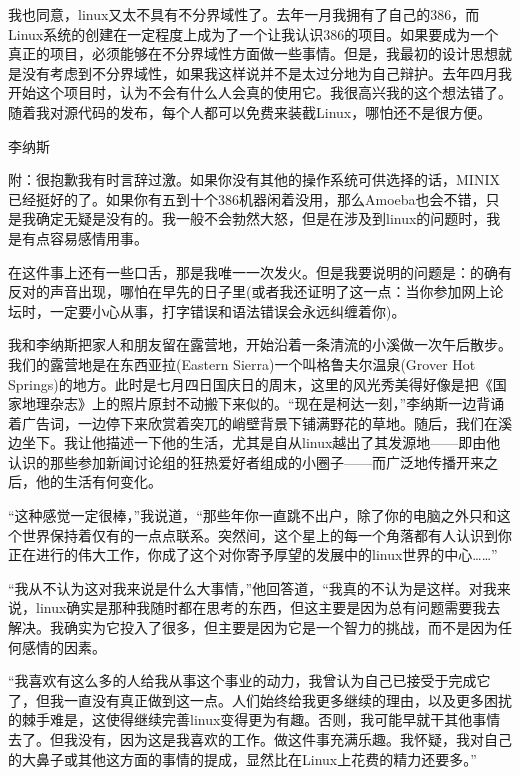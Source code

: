 我也同意，linux又太不具有不分界域性了。去年一月我拥有了自己的386，而Linux系统的创建在一定程度上成为了一个让我认识386的项目。如果要成为一个真正的项目，必须能够在不分界域性方面做一些事情。但是，我最初的设计思想就是没有考虑到不分界域性，如果我这样说并不是太过分地为自己辩护。去年四月我开始这个项目时，认为不会有什么人会真的使用它。我很高兴我的这个想法错了。随着我对源代码的发布，每个人都可以免费来装截Linux，哪怕还不是很方便。

李纳斯

 

附：很抱歉我有时言辞过激。如果你没有其他的操作系统可供选择的话，MINIX已经挺好的了。如果你有五到十个386机器闲着没用，那么Amoeba也会不错，只是我确定无疑是没有的。我一般不会勃然大怒，但是在涉及到linux的问题时，我是有点容易感情用事。

 

在这件事上还有一些口舌，那是我唯一一次发火。但是我要说明的问题是：的确有反对的声音出现，哪怕在早先的日子里(或者我还证明了这一点：当你参加网上论坛时，一定要小心从事，打字错误和语法错误会永远纠缠着你)。

 

我和李纳斯把家人和朋友留在露营地，开始沿着一条清流的小溪做一次午后散步。我们的露营地是在东西亚拉(Eastern Sierra)一个叫格鲁夫尔温泉(Grover Hot Springs)的地方。此时是七月四日国庆日的周末，这里的风光秀美得好像是把《国家地理杂志》上的照片原封不动搬下来似的。“现在是柯达一刻，”李纳斯一边背诵着广告词，一边停下来欣赏着突兀的峭壁背景下铺满野花的草地。随后，我们在溪边坐下。我让他描述一下他的生活，尤其是自从linux越出了其发源地——即由他认识的那些参加新闻讨论组的狂热爱好者组成的小圈子——而广泛地传播开来之后，他的生活有何变化。

“这种感觉一定很棒，”我说道，“那些年你一直跳不出户，除了你的电脑之外只和这个世界保持着仅有的一点点联系。突然间，这个星上的每一个角落都有人认识到你正在进行的伟大工作，你成了这个对你寄予厚望的发展中的linux世界的中心……”

“我从不认为这对我来说是什么大事情，”他回答道，“我真的不认为是这样。对我来说，linux确实是那种我随时都在思考的东西，但这主要是因为总有问题需要我去解决。我确实为它投入了很多，但主要是因为它是一个智力的挑战，而不是因为任何感情的因素。

“我喜欢有这么多的人给我从事这个事业的动力，我曾认为自己已接受于完成它了，但我一直没有真正做到这一点。人们始终给我更多继续的理由，以及更多困扰的棘手难是，这使得继续完善linux变得更为有趣。否则，我可能早就干其他事情去了。但我没有，因为这是我喜欢的工作。做这件事充满乐趣。我怀疑，我对自己的大鼻子或其他这方面的事情的提成，显然比在Linux上花费的精力还要多。”

